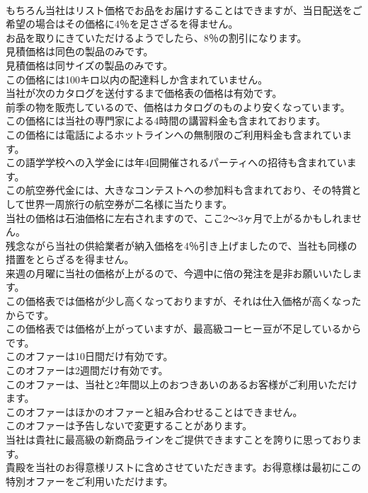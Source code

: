 \documentclass[8pt]{extreport}
\begin{document}
\begin{CJK}{UTF8}{min}
\\	もちろん当社はリスト価格でお品をお届けすることはできますが、当日配送をご希望の場合はその価格に4％を足さざるを得ません。  
\\	お品を取りにきていただけるようでしたら、8％の割引になります。  
\\	見積価格は同色の製品のみです。   
\\	見積価格は同サイズの製品のみです。   
\\	この価格には100キロ以内の配達料しか含まれていません。  
\\	当社が次のカタログを送付するまで価格表の価格は有効です。   
\\	前季の物を販売しているので、価格はカタログのものより安くなっています。   
\\	この価格には当社の専門家による4時間の講習料金も含まれております。   
\\	この価格には電話によるホットラインへの無制限のご利用料金も含まれています。  
\\	この語学学校への入学金には年4回開催されるパーティへの招待も含まれています。  
\\	この航空券代金には、大きなコンテストへの参加料も含まれており、その特賞として世界一周旅行の航空券が二名様に当たります。   
\\	当社の価格は石油価格に左右されますので、ここ2〜3ヶ月で上がるかもしれません。   
\\	残念ながら当社の供給業者が納入価格を4％引き上げましたので、当社も同様の措置をとらざるを得ません。  
\\	来週の月曜に当社の価格が上がるので、今週中に倍の発注を是非お願いいたします。   
\\	この価格表では価格が少し高くなっておりますが、それは仕入価格が高くなったからです。   
\\	この価格表では価格が上がっていますが、最高級コーヒー豆が不足しているからです。   
\\	このオファーは10日間だけ有効です。   
\\	このオファーは2週間だけ有効です。   
\\	このオファーは、当社と2年間以上のおつきあいのあるお客様がご利用いただけます。   
\\	このオファーはほかのオファーと組み合わせることはできません。   
\\	このオファーは予告しないで変更することがあります。  
\\	当社は貴社に最高級の新商品ラインをご提供できますことを誇りに思っております。   
\\	貴殿を当社のお得意様リストに含めさせていただきます。お得意様は最初にこの特別オファーをご利用いただけます。   

\end{CJK}
\end{document}
